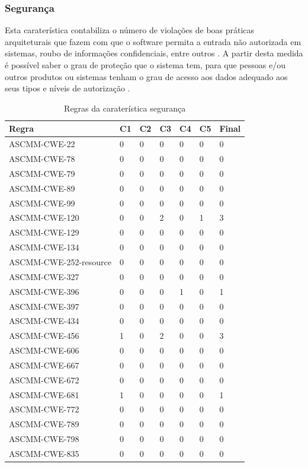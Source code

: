 \documentclass[openany,10pt,a4paper]{article}
\begin{document}
\subsubsection{Segurança}
Esta caraterística contabiliza o número de violações de boas práticas arquiteturais que fazem com que o software permita a entrada não autorizada em sistemas, roubo de informações confidenciais, entre outros \cite{OMG_Security}. A partir desta medida é possível saber o grau de proteção que o sistema tem, para que pessoas e/ou outros produtos ou sistemas tenham o grau de acesso aos dados adequado aos seus tipos e níveis de autorização \cite{security_iso}.
\begin{samepage}
\begin{longtable}{p{1.9in}|p{0.28in}|p{0.28in}|p{0.28in}|p{0.28in}|p{0.28in}|p{0.35in}}
		\caption{Regras da caraterística segurança}
		\label{table_security}
		\endhead
		\hline	
		\textbf{Regra} & \textbf{C1} & \textbf{C2} & \textbf{C3} & \textbf{C4} & \textbf{C5} & \textbf{Final} \\ \hline
		ASCMM-CWE-22 & 0 & 0 & 0 & 0 & 0 & 0 \\ \hline
		ASCMM-CWE-78 & 0 & 0 & 0 & 0 & 0 & 0 \\ \hline
		ASCMM-CWE-79 & 0 & 0 & 0 & 0 & 0 & 0 \\ \hline
		ASCMM-CWE-89 & 0 & 0 & 0 & 0 & 0 & 0 \\ \hline
		ASCMM-CWE-99 & 0 & 0 & 0 & 0 & 0 & 0 \\ \hline
		ASCMM-CWE-120 & 0 & 0 & 2 & 0 & 1 & 3 \\ \hline
		ASCMM-CWE-129 & 0 & 0 & 0 & 0 & 0 & 0 \\ \hline
		ASCMM-CWE-134 & 0 & 0 & 0 & 0 & 0 & 0 \\ \hline
		ASCMM-CWE-252-resource & 0 & 0 & 0 & 0 & 0 & 0 \\ \hline
		ASCMM-CWE-327 & 0 & 0 & 0 & 0 & 0 & 0 \\ \hline
		ASCMM-CWE-396 & 0 & 0 & 0 & 1 & 0 & 1 \\ \hline
		ASCMM-CWE-397 & 0 & 0 & 0 & 0 & 0 & 0 \\ \hline
		ASCMM-CWE-434 & 0 & 0 & 0 & 0 & 0 & 0 \\ \hline
		ASCMM-CWE-456 & 1 & 0 & 2 & 0 & 0 & 3 \\ \hline
		ASCMM-CWE-606 & 0 & 0 & 0 & 0 & 0 & 0 \\ \hline
		ASCMM-CWE-667 & 0 & 0 & 0 & 0 & 0 & 0 \\ \hline
		ASCMM-CWE-672 & 0 & 0 & 0 & 0 & 0 & 0 \\ \hline
		ASCMM-CWE-681 & 1 & 0 & 0 & 0 & 0 & 1 \\ \hline
		ASCMM-CWE-772 & 0 & 0 & 0 & 0 & 0 & 0 \\ \hline
		ASCMM-CWE-789 & 0 & 0 & 0 & 0 & 0 & 0 \\ \hline
		ASCMM-CWE-798 & 0 & 0 & 0 & 0 & 0 & 0 \\ \hline
		ASCMM-CWE-835 & 0 & 0 & 0 & 0 & 0 & 0 \\ \hline
\end{longtable}
\end{samepage}
\end{document}
